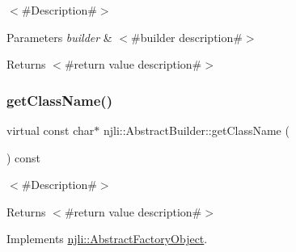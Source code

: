$<$\#\+Description\#$>$


\begin{DoxyParams}{Parameters}
{\em builder} & $<$\#builder description\#$>$\\
\hline
\end{DoxyParams}
\begin{DoxyReturn}{Returns}
$<$\#return value description\#$>$ 
\end{DoxyReturn}
\mbox{\label{classnjli_1_1_abstract_builder_a902f73ea78031b06aca183a417f3413b}} 
\subsubsection{\texorpdfstring{get\+Class\+Name()}{getClassName()}}
{\footnotesize\ttfamily virtual const char$\ast$ njli\+::\+Abstract\+Builder\+::get\+Class\+Name (\begin{DoxyParamCaption}{ }\end{DoxyParamCaption}) const\hspace{0.3cm}{\ttfamily [pure virtual]}}

$<$\#\+Description\#$>$

\begin{DoxyReturn}{Returns}
$<$\#return value description\#$>$ 
\end{DoxyReturn}


Implements \mbox{\hyperlink{classnjli_1_1_abstract_factory_object_af4151e41b80d5bc3fc42822c67fc2278}{njli\+::\+Abstract\+Factory\+Object}}.



